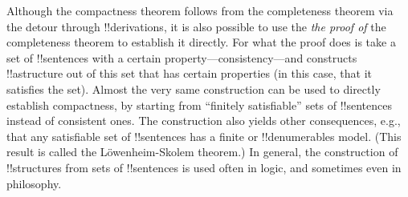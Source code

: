 \documentclass[../../../include/open-logic-section]{subfiles}
\begin{document}
Although the compactness theorem follows from the completeness theorem
via the detour through !!{derivation}s, it is also possible to use the
\emph{the proof of} the completeness theorem to establish it
directly. For what the proof does is take a set of !!{sentence}s with
a certain property---consistency---and constructs !!a{structure} out
of this set that has certain properties (in this case, that it
satisfies the set). Almost the very same construction can be used to
directly establish compactness, by starting from ``finitely
satisfiable'' sets of !!{sentence}s instead of consistent ones.  The
construction also yields other consequences, e.g., that any
satisfiable set of !!{sentence}s has a finite or !!{denumerable}s
model.  (This result is called the L\"owenheim-Skolem theorem.)  In
general, the construction of !!{structure}s from sets of !!{sentence}s
is used often in logic, and sometimes even in philosophy.
\end{document}
